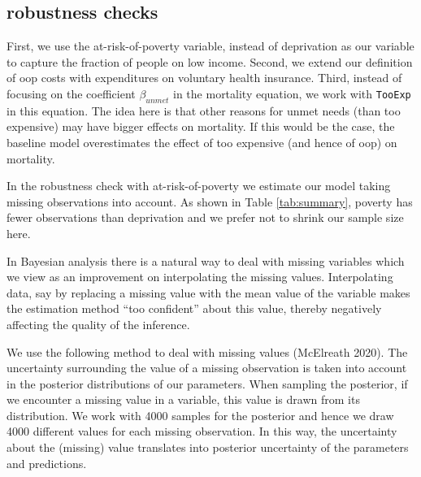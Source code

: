 \documentclass[a4paper,12pt]{article}
\makeatletter
\newcommand{\citeprocitem}[2]{\hyper@linkstart{cite}{citeproc_bib_item_#1}#2\hyper@linkend}
\makeatother
\begin{document}
\subsection{robustness checks}
\label{sec:orgbccb915}


First, we use the at-risk-of-poverty variable, instead of deprivation as our variable to capture the fraction of people on low income. Second, we extend our definition of oop costs with expenditures on voluntary health insurance. Third, instead of focusing on the coefficient \(\beta_{unmet}\) in the mortality equation, we work with \texttt{TooExp} in this equation. The idea here is that other reasons for unmet needs (than too expensive) may have bigger effects on mortality. If this would be the case, the baseline model overestimates the effect of too expensive (and hence of oop) on mortality.

In the robustness check with at-risk-of-poverty we estimate our model taking missing observations into account. As shown in Table \ref{tab:summary}, poverty has fewer observations than deprivation and we prefer not to shrink our sample size here. 

In Bayesian analysis there is a natural way to deal with missing variables which we view as an improvement on interpolating the missing values. Interpolating data, say by replacing a missing value with the mean value of the variable makes the estimation method ``too confident'' about this value, thereby negatively affecting the quality of the inference.

We use the following method to deal with missing values (\citeprocitem{17}{McElreath 2020}). The uncertainty surrounding the value of a missing observation is taken into account in the posterior distributions of our parameters. When sampling the posterior, if we encounter a missing value in a variable, this value is drawn from its distribution. We work with 4000 samples for the posterior and hence we draw 4000 different values for each missing observation. In this way, the uncertainty about the (missing) value translates into posterior uncertainty of the parameters and predictions.
\end{document}

